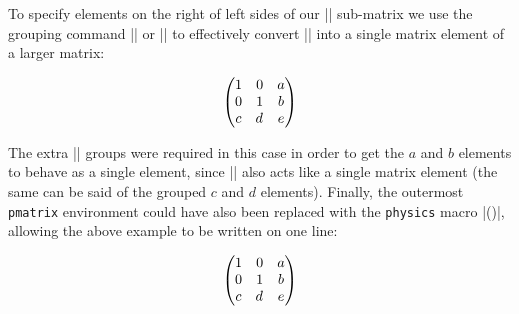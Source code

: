 \begin{frame}[fragile]
To specify elements on the right of left sides of our \LC|| sub-matrix we use the grouping command \LC|\matrixquantity| or \LC|\mqty| to effectively convert \LC|| into a single matrix element of a larger matrix:

\begin{latexexamplesplit}[0.6]
\begin{equation}
  \begin{pmatrix}
    \mqty{\imat{2}} & \mqty{a\\b} \\ 
    \mqty{c & d}    & e
  \end{pmatrix}
\end{equation}
\end{latexexamplesplit}

\end{frame}

\begin{frame}[fragile]
The extra \LC|\mqty| groups were required in this case in order to get the $a$ and $b$ elements to behave as a single element, since \LC|| also acts like a single matrix element (the same can be said of the grouped $c$ and $d$ elements). Finally, the outermost \texttt{pmatrix} environment could have also been replaced with the \texttt{physics} macro \LC|\mqty()|, allowing the above example to be written on one line:

\begin{latexexamplesplit}[0.6]
\begin{equation}
  \mqty(
    \mqty{\imat{2}} & \mqty{a\\b} \\ 
    \mqty{c & d}    & e
  )
\end{equation}
\end{latexexamplesplit}

\end{frame}

